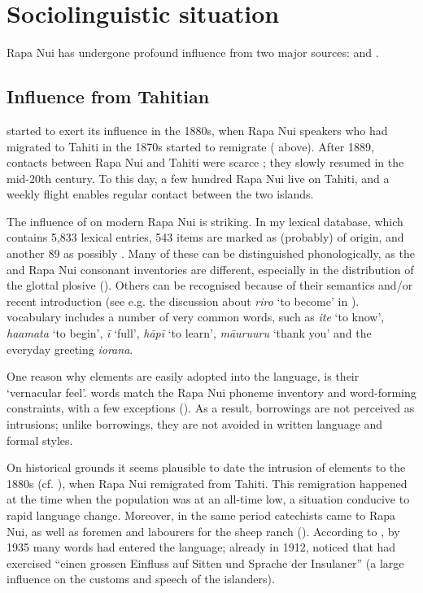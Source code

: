 \section{Sociolinguistic situation}\label{sec:1.4}

Rapa Nui has undergone profound influence from two major sources:  and .

\subsection{Influence from Tahitian}\label{sec:1.4.1}

 started to exert its influence in the 1880s, when Rapa Nui speakers who had migrated to Tahiti in the 1870s started to remigrate ( above). After 1889, contacts between Rapa Nui and Tahiti were scarce \citep[141]{Fischer2005}; they slowly resumed in the mid-20th century. To this day, a few hundred Rapa Nui live on Tahiti, and a weekly flight enables regular contact between the two islands.

The influence of  on modern Rapa Nui is striking. In my lexical database, which contains 5,833 lexical entries, 543 items are marked as (probably) of  origin, and another 89 as possibly . Many of these can be distinguished phonologically, as the  and Rapa Nui consonant inventories are different, especially in the distribution of the glottal plosive (). Others can be recognised because of their semantics and/or recent introduction (see e.g. the discussion about \textit{riro} ‘to become’ in ).  vocabulary includes a number of very common words, such as \textit{{\ꞌ}ite} ‘to know’, \textit{ha{\ꞌ}amata} ‘to begin’, \textit{{\ꞌ}ī} ‘full’, \textit{hāpī} ‘to learn’, \textit{māuruuru} ‘thank you’ and the everyday greeting \textit{{\ꞌ}iorana}.

One reason why  elements are easily adopted into the language, is their ‘vernacular feel’.  words match the Rapa Nui phoneme inventory and word-forming constraints, with a few exceptions (). As a result,  borrowings are not perceived as intrusions; unlike  borrowings, they are not avoided in written language and formal styles.

On historical grounds it seems plausible to date the intrusion of  elements to the 1880s (cf. \citealt[315]{Fischer2001Hispan}), when Rapa Nui remigrated from Tahiti. This remigration happened at the time when the population was at an all-time low, a situation conducive to rapid language change. Moreover, in the same period  catechists came to Rapa Nui, as well as foremen and labourers for the sheep ranch (\citealt[101]{DiCastri1999}). According to \citet[32]{Métraux1971}, by 1935 many  words had entered the language; already in 1912, \citet[65]{Knoche1912} noticed that  had exercised “einen grossen Einfluss auf Sitten und Sprache der Insulaner” (a large influence on the customs and speech of the islanders).

